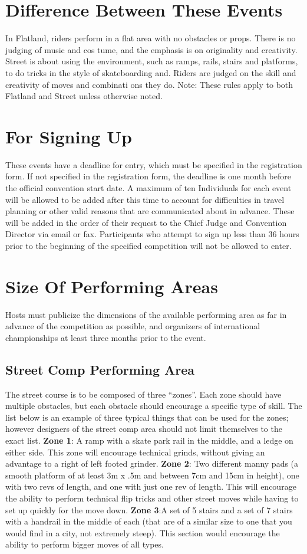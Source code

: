 \section{Difference Between These Events}
In Flatland, riders perform in a flat area with no obstacles or props. There is no judging of music and cos
tume, and the
emphasis is on originality and creativity. Street is about using the environment, such as ramps, rails, stairs and platforms,
to do tricks in the style of skateboarding and. Riders are judged on the skill and creativity of moves and combinati
ons they
do.
Note:
These rules apply to both Flatland and Street unless otherwise noted.
\section{ For Signing Up}
These events have a deadline for entry, which must be specified in the registration form. If not specified in the registration
form, the deadline is one month before the official convention start date. A maximum of ten Individuals for each event will
be allowed to be added after this time to account for difficulties in travel planning or other valid reasons that are communicated about in advance. These will be added in the order of their request to the Chief Judge and Convention Director via email or fax. Participants who attempt to sign up less than 36 hours prior to the beginning of the specified competition will not be allowed to enter.
\section{Size Of Performing Areas }
Hosts must publicize the dimensions of the available performing area as far in advance of the competition as possible, and
organizers of international championships at least three months prior to the event.
\subsection{Street Comp Performing Area}
The street course is to be composed of three “zones”. Each zone should have multiple obstacles, but each obstacle
should encourage a specific type of skill. The list below is an example of three typical things that can be used for the
zones; however designers of the street comp area should not limit themselves to the exact list.
\textbf{Zone 1}: A ramp with a skate park rail in the middle, and a ledge on either side. This zone will encourage technical
grinds, without giving an advantage to a right of left footed grinder.
\textbf{Zone 2}: Two different manny pads (a smooth platform of at least 3m x .5m and between 7cm and 15cm in height), one with two revs of length, and one with just one rev of length. This will encourage the ability to perform technical flip tricks and other street moves while having to set up quickly for the move down.
\textbf{Zone 3}:A set of 5 stairs and a set of 7 stairs with a handrail in the middle of each (that are of a similar size to one that you would find in a city, not extremely steep). This section would encourage the ability to perform bigger moves of all types.
